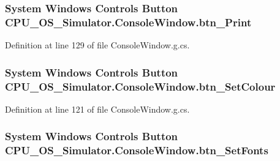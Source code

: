 \subsubsection[{btn\+\_\+\+Print}]{\setlength{\rightskip}{0pt plus 5cm}System Windows Controls Button C\+P\+U\+\_\+\+O\+S\+\_\+\+Simulator.\+Console\+Window.\+btn\+\_\+\+Print\hspace{0.3cm}{\ttfamily [package]}}\label{class_c_p_u___o_s___simulator_1_1_console_window_a2121b0cebbdb2d27c54073ff8dc4bb8e}


Definition at line 129 of file Console\+Window.\+g.\+cs.

\hypertarget{class_c_p_u___o_s___simulator_1_1_console_window_a374a86e391068f8d05edb9649ce3d7f4}{}
\subsubsection[{btn\+\_\+\+Set\+Colour}]{\setlength{\rightskip}{0pt plus 5cm}System Windows Controls Button C\+P\+U\+\_\+\+O\+S\+\_\+\+Simulator.\+Console\+Window.\+btn\+\_\+\+Set\+Colour\hspace{0.3cm}{\ttfamily [package]}}\label{class_c_p_u___o_s___simulator_1_1_console_window_a374a86e391068f8d05edb9649ce3d7f4}


Definition at line 121 of file Console\+Window.\+g.\+cs.

\hypertarget{class_c_p_u___o_s___simulator_1_1_console_window_acc0899b3327a38a47568660cf947ee31}{}
\subsubsection[{btn\+\_\+\+Set\+Fonts}]{\setlength{\rightskip}{0pt plus 5cm}System Windows Controls Button C\+P\+U\+\_\+\+O\+S\+\_\+\+Simulator.\+Console\+Window.\+btn\+\_\+\+Set\+Fonts\hspace{0.3cm}{\ttfamily [package]}}\label{class_c_p_u___o_s___simulator_1_1_console_window_acc0899b3327a38a47568660cf947ee31}


